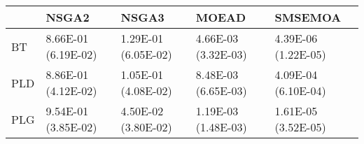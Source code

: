 \begin{tabular}{lllll}
\toprule
{} &                NSGA2 &                NSGA3 &                MOEAD &              SMSEMOA \\
\midrule
BT  &  8.66E-01 (6.19E-02) &  1.29E-01 (6.05E-02) &  4.66E-03 (3.32E-03) &  4.39E-06 (1.22E-05) \\
PLD &  8.86E-01 (4.12E-02) &  1.05E-01 (4.08E-02) &  8.48E-03 (6.65E-03) &  4.09E-04 (6.10E-04) \\
PLG &  9.54E-01 (3.85E-02) &  4.50E-02 (3.80E-02) &  1.19E-03 (1.48E-03) &  1.61E-05 (3.52E-05) \\
\bottomrule
\end{tabular}
